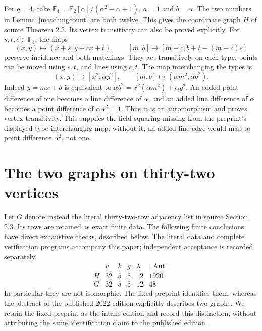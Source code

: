 \documentclass[11pt,a4paper]{article}
\newcommand{\F}{\mathbb F}
\begin{document}
For $q=4$, take $\F_4=\F_2[\alpha]/(\alpha^2+\alpha+1)$,
$a=1$ and $b=\alpha$. The two numbers in Lemma~\ref{matchingcount}
are both twelve. This gives the coordinate graph $H$ of source
Theorem 2.2. Its vertex transitivity can also be proved explicitly.
For $s,t,c\in\F_4$, the maps
\[
 (x,y)\longmapsto(x+s,y+cx+t),\qquad
 [m,b]\longmapsto[m+c,b+t-(m+c)s]
\]
preserve incidence and both matchings. They act transitively on each
type: points can be moved using $s,t$, and lines using $c,t$.
The map interchanging the types is
\[
 (x,y)\longmapsto[x^2,\alpha y^2],\qquad
 [m,b]\longmapsto(\alpha m^2,\alpha b^2).
\]
Indeed $y=mx+b$ is equivalent to
$\alpha b^2=x^2(\alpha m^2)+\alpha y^2$. An added point
difference of one becomes a line difference of $\alpha$, and an
added line difference of $\alpha$ becomes a point difference of
$\alpha\alpha^2=1$. Thus it is an automorphism and proves vertex
transitivity. This supplies the field squaring missing from the
preprint's displayed type-interchanging map; without it, an added
line edge would map to point difference $\alpha^2$, not one.

\section{The two graphs on thirty-two vertices}
Let $G$ denote instead the literal thirty-two-row adjacency list in
source Section 2.3. Its rows are retained as exact finite data. The
following finite conclusions have direct exhaustive checks, described
below. The literal data and complete verification programs accompany
this paper; independent acceptance is recorded separately.
\[
\begin{array}{c|rrrrr}
 &v&k&g&\lambda&|\operatorname{Aut}|\\\hline
 H&32&5&5&12&1920\\
 G&32&5&5&12&48
\end{array}
\]
In particular they are not isomorphic. The fixed preprint identifies
them, whereas the abstract of the published 2022 edition explicitly
describes two graphs. We retain the fixed preprint as the intake
edition and record this distinction, without attributing the same
identification claim to the published edition.
\end{document}
